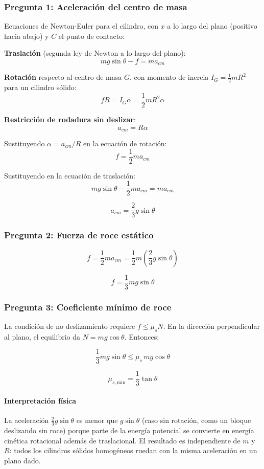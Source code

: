 \begin{sol}

\subsubsection*{Pregunta 1: Aceleración del centro de masa}

Ecuaciones de Newton-Euler para el cilindro, con $x$ a lo largo del plano (positivo hacia abajo) y $C$ el punto de contacto:

\textbf{Traslación} (segunda ley de Newton a lo largo del plano):
$$mg\sin\theta - f = ma_{cm}$$

\textbf{Rotación} respecto al centro de masa $G$, con momento de inercia $I_G = \frac{1}{2}mR^2$ para un cilindro sólido:
$$fR = I_G \alpha = \frac{1}{2}mR^2\alpha$$

\textbf{Restricción de rodadura sin deslizar}:
$$a_{cm} = R\alpha$$

Sustituyendo $\alpha = a_{cm}/R$ en la ecuación de rotación:
$$f = \frac{1}{2}m a_{cm}$$

Sustituyendo en la ecuación de traslación:
$$mg\sin\theta - \frac{1}{2}m a_{cm} = m a_{cm}$$

$$\boxed{a_{cm} = \frac{2}{3}g\sin\theta}$$

\subsubsection*{Pregunta 2: Fuerza de roce estático}

$$f = \frac{1}{2}m a_{cm} = \frac{1}{2}m\left(\frac{2}{3}g\sin\theta\right)$$

$$\boxed{f = \frac{1}{3}mg\sin\theta}$$

\subsubsection*{Pregunta 3: Coeficiente mínimo de roce}

La condición de no deslizamiento requiere $f \leq \mu_s N$. En la dirección perpendicular al plano, el equilibrio da $N = mg\cos\theta$. Entonces:

$$\frac{1}{3}mg\sin\theta \leq \mu_s \, mg\cos\theta$$

$$\boxed{\mu_{s,\text{min}} = \frac{1}{3}\tan\theta}$$

\paragraph{Interpretación física} La aceleración $\frac{2}{3}g\sin\theta$ es menor que $g\sin\theta$ (caso sin rotación, como un bloque deslizando sin roce) porque parte de la energía potencial se convierte en energía cinética rotacional además de traslacional. El resultado es independiente de $m$ y $R$: todos los cilindros sólidos homogéneos ruedan con la misma aceleración en un plano dado.

\end{sol}
